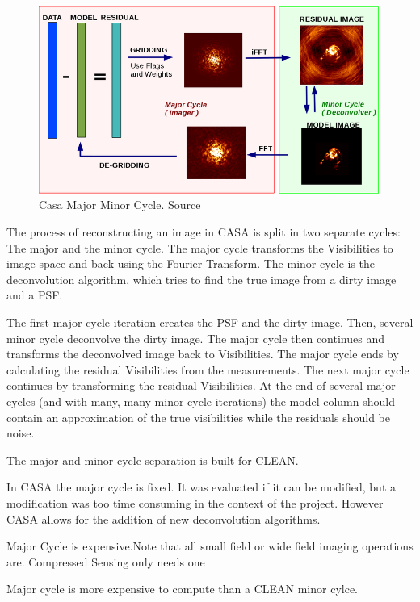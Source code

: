 \begin{figure}
	\centering
	\vspace{-15pt}
	\includegraphics[width=0.9\linewidth]{./chapters/04.cs/img/casa_major_minor.png}
	\caption{Casa Major Minor Cycle. Source \cite{casa2018major}}
	\label{cs:major}
	\vspace{-10pt}
\end{figure}

The process of reconstructing an image in CASA is split in two separate cycles: The major and the minor cycle. The major cycle transforms the Visibilities to image space and back using the Fourier Transform. The minor cycle is the deconvolution algorithm, which tries to find the true image from a dirty image and a PSF. 

The first major cycle iteration creates the PSF and the dirty image. Then, several minor cycle deconvolve the dirty image. The major cycle then continues and transforms the deconvolved image back to Visibilities. The major cycle ends by calculating the residual Visibilities from the measurements. The next major cycle continues by transforming the residual Visibilities. At the end of several major cycles (and with many, many minor cycle iterations) the model column should contain an approximation of the true visibilities while the residuals should be noise. 


The major and minor cycle separation is built for CLEAN.


In CASA the major cycle is fixed. It was evaluated if it can be modified, but a modification was too time consuming in the context of the project. However CASA allows for the addition of new deconvolution algorithms. 

Major Cycle is expensive.Note that all small field or wide field imaging operations are. Compressed Sensing only needs one


Major cycle is more expensive to compute than a CLEAN minor cylce. 

